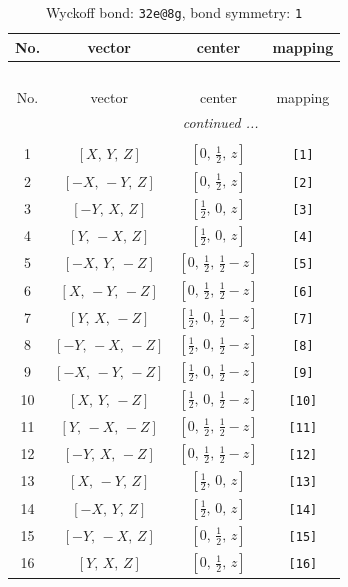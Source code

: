 \documentclass[fleqn,8pt]{jsarticle}
\begin{document}
\begin{longtable}{cccc}
\caption{Wyckoff bond: {\tt 32e@8g}, bond symmetry: {\tt 1}}
 \\
 \hline \hline
No. & vector & center & mapping \\ \hline \endfirsthead

\multicolumn{3}{l}{\tablename\ \thetable{}} \\
 \hline \hline
No. & vector & center & mapping \\ \hline \endhead

 \hline \hline
\multicolumn{3}{r}{\footnotesize\it continued ...} \\ \endfoot

 \hline \hline
\multicolumn{3}{r}{} \\ \endlastfoot

1 & $\left[ X,\, Y,\, Z \right]$ & $\left[ 0,\, \frac{1}{2},\, z \right]$ & {\tt [1]} \\ \hline
2 & $\left[ - X,\, - Y,\, Z \right]$ & $\left[ 0,\, \frac{1}{2},\, z \right]$ & {\tt [2]} \\ \hline
3 & $\left[ - Y,\, X,\, Z \right]$ & $\left[ \frac{1}{2},\, 0,\, z \right]$ & {\tt [3]} \\ \hline
4 & $\left[ Y,\, - X,\, Z \right]$ & $\left[ \frac{1}{2},\, 0,\, z \right]$ & {\tt [4]} \\ \hline
5 & $\left[ - X,\, Y,\, - Z \right]$ & $\left[ 0,\, \frac{1}{2},\, \frac{1}{2} - z \right]$ & {\tt [5]} \\ \hline
6 & $\left[ X,\, - Y,\, - Z \right]$ & $\left[ 0,\, \frac{1}{2},\, \frac{1}{2} - z \right]$ & {\tt [6]} \\ \hline
7 & $\left[ Y,\, X,\, - Z \right]$ & $\left[ \frac{1}{2},\, 0,\, \frac{1}{2} - z \right]$ & {\tt [7]} \\ \hline
8 & $\left[ - Y,\, - X,\, - Z \right]$ & $\left[ \frac{1}{2},\, 0,\, \frac{1}{2} - z \right]$ & {\tt [8]} \\ \hline
9 & $\left[ - X,\, - Y,\, - Z \right]$ & $\left[ \frac{1}{2},\, 0,\, \frac{1}{2} - z \right]$ & {\tt [9]} \\ \hline
10 & $\left[ X,\, Y,\, - Z \right]$ & $\left[ \frac{1}{2},\, 0,\, \frac{1}{2} - z \right]$ & {\tt [10]} \\ \hline
11 & $\left[ Y,\, - X,\, - Z \right]$ & $\left[ 0,\, \frac{1}{2},\, \frac{1}{2} - z \right]$ & {\tt [11]} \\ \hline
12 & $\left[ - Y,\, X,\, - Z \right]$ & $\left[ 0,\, \frac{1}{2},\, \frac{1}{2} - z \right]$ & {\tt [12]} \\ \hline
13 & $\left[ X,\, - Y,\, Z \right]$ & $\left[ \frac{1}{2},\, 0,\, z \right]$ & {\tt [13]} \\ \hline
14 & $\left[ - X,\, Y,\, Z \right]$ & $\left[ \frac{1}{2},\, 0,\, z \right]$ & {\tt [14]} \\ \hline
15 & $\left[ - Y,\, - X,\, Z \right]$ & $\left[ 0,\, \frac{1}{2},\, z \right]$ & {\tt [15]} \\ \hline
16 & $\left[ Y,\, X,\, Z \right]$ & $\left[ 0,\, \frac{1}{2},\, z \right]$ & {\tt [16]} \\
\end{longtable}
\end{document}
